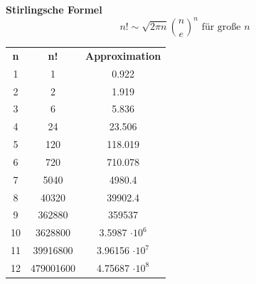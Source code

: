 \begin{erg}
    \textbf{Stirlingsche Formel} 
    \begin{equation}
        \label{eq:strilingscheformel}
        n! \sim \sqrt{2 \pi n} \binom{n}{e}^n \text{ für große } n
    \end{equation}
    \begin{mytable}
        \begin{tabular}{ccc}
            \textbf{n} & \textbf{n!} & \textbf{Approximation} \\
            1 & 1 & 0.922 \\
            2 & 2 & 1.919 \\
            3 & 6 & 5.836 \\
            4 & 24 & 23.506 \\
            5 & 120 & 118.019 \\
            6 & 720 & 710.078 \\
            7 & 5040 & 4980.4 \\
            8 & 40320 & 39902.4 \\
            9 & 362880 & 359537 \\
            10 & 3628800 & 3.5987 $\cdot 10^6$ \\
            11 & 39916800 & 3.96156 $\cdot 10^7$ \\
            12 & 479001600 & 4.75687 $\cdot 10^8$ \\
        \end{tabular}
        \caption{Exact factorial values and their approximations.}
        \label{tab:factorial_approx}
    \end{mytable}
\end{erg}


